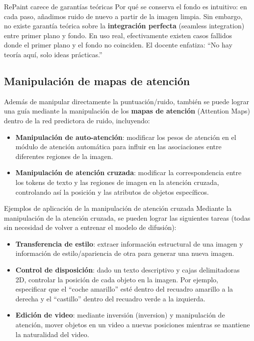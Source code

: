 \begin{warningbox}{RePaint carece de garantías teóricas}
Por qué se conserva el fondo es intuitivo: en cada paso, añadimos ruido de nuevo a partir de la imagen limpia. Sin embargo, no existe garantía teórica sobre la \textbf{integración perfecta} (seamless integration) entre primer plano y fondo. En uso real, efectivamente existen casos fallidos donde el primer plano y el fondo no coinciden. El docente enfatiza: ``No hay teoría aquí, solo ideas prácticas.''
\end{warningbox}

\subsection{Manipulación de mapas de atención}

Además de manipular directamente la puntuación/ruido, también se puede lograr una guía mediante la manipulación de los \textbf{mapas de atención} (Attention Maps) dentro de la red predictora de ruido, incluyendo:

\begin{itemize}
    \item \textbf{Manipulación de auto-atención}: modificar los pesos de atención en el módulo de atención automática para influir en las asociaciones entre diferentes regiones de la imagen.
    \item \textbf{Manipulación de atención cruzada}: modificar la correspondencia entre los tokens de texto y las regiones de imagen en la atención cruzada, controlando así la posición y las atributos de objetos específicos.
\end{itemize}

\begin{knowledgebox}{Ejemplos de aplicación de la manipulación de atención cruzada}
Mediante la manipulación de la atención cruzada, se pueden lograr las siguientes tareas (todas sin necesidad de volver a entrenar el modelo de difusión):
\begin{itemize}
    \item \textbf{Transferencia de estilo}: extraer información estructural de una imagen y información de estilo/apariencia de otra para generar una nueva imagen.
    \item \textbf{Control de disposición}: dado un texto descriptivo y cajas delimitadoras 2D, controlar la posición de cada objeto en la imagen. Por ejemplo, especificar que el ``coche amarillo'' esté dentro del recuadro amarillo a la derecha y el ``castillo'' dentro del recuadro verde a la izquierda.
    \item \textbf{Edición de video}: mediante inversión (inversion) y manipulación de atención, mover objetos en un video a nuevas posiciones mientras se mantiene la naturalidad del video.
\end{itemize}
\end{knowledgebox}

